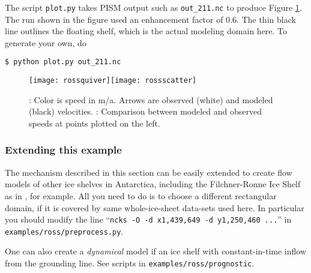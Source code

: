 The script \texttt{plot.py} takes PISM output such as \texttt{out_211.nc} to produce Figure \ref{fig:rosspython}.  The run shown in the figure used an enhancement factor of $0.6$.  The thin black line outlines the floating shelf, which is the actual modeling domain here.  To generate your own, do

\begin{verbatim}
$ python plot.py out_211.nc
\end{verbatim}%

\begin{figure}[ht]
\centering
\mbox{\texttt{[image: rossquiver]}\quad \texttt{[image: rossscatter]}}
\caption{: Color is speed in m/a.  Arrows are observed (white) and modeled (black) velocities.  : Comparison between modeled and observed speeds at points plotted on the left.}
\label{fig:rosspython}
\end{figure}

\subsubsection*{Extending this example}

The mechanism described in this section can be easily extended to create flow models of other ice shelves in Antarctica, including the Filchner-Ronne Ice Shelf as in \cite{AlbrechtLevermann2012}, for example.  All you need to do is to choose a different rectangular domain, if it is covered by same whole-ice-sheet data-sets used here.  In particular you should modify the line ``\texttt{ncks -O -d x1,439,649 -d y1,250,460 ...}'' in \texttt{examples/ross/preprocess.py}.

One can also create a \emph{dynamical} model if an ice shelf with constant-in-time inflow from the grounding line. See scripts in \texttt{examples/ross/prognostic}.

